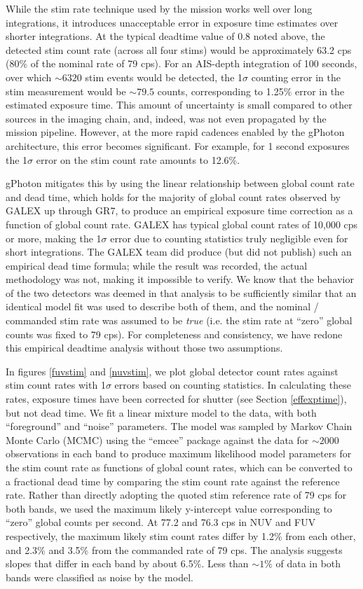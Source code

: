\documentclass[preprint]{aastex}
\begin{document}
While the stim rate technique used by the mission works well over long integrations, it introduces unacceptable error in exposure time estimates over shorter integrations. At the typical deadtime value of 0.8 noted above, the detected stim count rate (across all four stims) would be approximately 63.2 cps (80\% of the nominal rate of 79 cps). For an AIS-depth integration of 100 seconds, over which $\sim 6320$ stim events would be detected, the 1$\sigma$ counting error in the stim measurement would be $\sim 79.5$ counts, corresponding to 1.25\% error in the estimated exposure time. This amount of uncertainty is small compared to other sources in the imaging chain, and, indeed, was not even propagated by the mission pipeline. However, at the more rapid cadences enabled by the gPhoton architecture, this error becomes significant. For example, for 1 second exposures the 1$\sigma$ error on the stim count rate amounts to 12.6\%.

gPhoton mitigates this by using the linear relationship between global count rate and dead time, which holds for the majority of global count rates observed by GALEX up through GR7, to produce an empirical exposure time correction as a function of global count rate. GALEX has typical global count rates of 10,000 cps or more, making the 1$\sigma$ error due to counting statistics truly negligible even for short integrations. The GALEX team did produce (but did not publish) such an empirical dead time formula; while the result was recorded, the actual methodology was not, making it impossible to verify. We know that the behavior of the two detectors was deemed in that analysis to be sufficiently similar that an identical model fit was used to describe both of them, and the nominal / commanded stim rate was assumed to be \emph{true} (i.e. the stim rate at ``zero'' global counts was fixed to 79 cps). For completeness and consistency, we have redone this empirical deadtime analysis without those two assumptions.

In figures \ref{fuvstim} and \ref{nuvstim}, we plot global detector count rates against stim count rates with 1$\sigma$ errors based on counting statistics. In calculating these rates, exposure times have been corrected for shutter (see Section \ref{effexptime}), but not dead time. We fit a linear mixture model to the data, with both ``foreground'' and ``noise'' parameters. The model was sampled by Markov Chain Monte Carlo (MCMC) using the ``emcee'' package \citep{for2013} against the data for $\sim 2000$ observations in each band to produce maximum likelihood model parameters for the stim count rate as functions of global count rates, which can be converted to a fractional dead time by comparing the stim count rate against the reference rate. Rather than directly adopting the quoted stim reference rate of 79 cps for both bands, we used the maximum likely y-intercept value corresponding to ``zero'' global counts per second. At 77.2 and 76.3 cps in NUV and FUV respectively, the maximum likely stim count rates differ by 1.2\% from each other, and 2.3\% and 3.5\% from the commanded rate of 79 cps. The analysis suggests slopes that differ in each band by about 6.5\%. Less than $\sim 1\%$ of data in both bands were classified as noise by the model.
\end{document}
